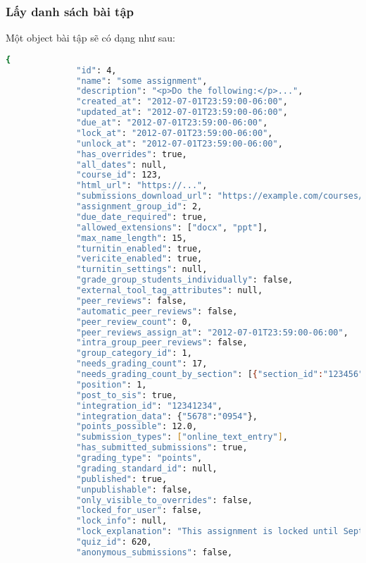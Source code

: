 \documentclass[../Thesis.tex]{subfiles}
\begin{document}
        \subsubsection{Lấy danh sách bài tập}
            Một object bài tập sẽ có dạng như sau:
            \begin{lstlisting}[language=bash]
              {
              "id": 4,
              "name": "some assignment",
              "description": "<p>Do the following:</p>...",
              "created_at": "2012-07-01T23:59:00-06:00",
              "updated_at": "2012-07-01T23:59:00-06:00",
              "due_at": "2012-07-01T23:59:00-06:00",
              "lock_at": "2012-07-01T23:59:00-06:00",
              "unlock_at": "2012-07-01T23:59:00-06:00",
              "has_overrides": true,
              "all_dates": null,
              "course_id": 123,
              "html_url": "https://...",
              "submissions_download_url": "https://example.com/courses/:course_id/assignments/:id/submissions?zip=1",
              "assignment_group_id": 2,
              "due_date_required": true,
              "allowed_extensions": ["docx", "ppt"],
              "max_name_length": 15,
              "turnitin_enabled": true,
              "vericite_enabled": true,
              "turnitin_settings": null,
              "grade_group_students_individually": false,
              "external_tool_tag_attributes": null,
              "peer_reviews": false,
              "automatic_peer_reviews": false,
              "peer_review_count": 0,
              "peer_reviews_assign_at": "2012-07-01T23:59:00-06:00",
              "intra_group_peer_reviews": false,
              "group_category_id": 1,
              "needs_grading_count": 17,
              "needs_grading_count_by_section": [{"section_id":"123456","needs_grading_count":5}, {"section_id":"654321","needs_grading_count":0}],
              "position": 1,
              "post_to_sis": true,
              "integration_id": "12341234",
              "integration_data": {"5678":"0954"},
              "points_possible": 12.0,
              "submission_types": ["online_text_entry"],
              "has_submitted_submissions": true,
              "grading_type": "points",
              "grading_standard_id": null,
              "published": true,
              "unpublishable": false,
              "only_visible_to_overrides": false,
              "locked_for_user": false,
              "lock_info": null,
              "lock_explanation": "This assignment is locked until September 1 at 12:00am",
              "quiz_id": 620,
              "anonymous_submissions": false,

\end{lstlisting}
\end{document}
